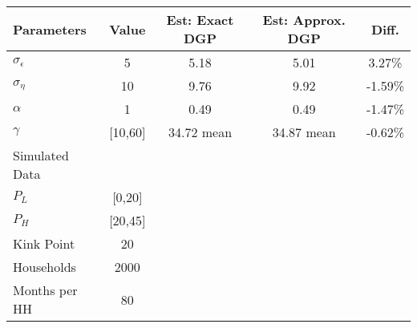 \begin{tabular}{|lcccc|}
\hline
Parameters & Value & Est: Exact DGP  &  Est: Approx. DGP & Diff.   \\
\hline
\hline
$\sigma_{\epsilon}$  &5 &5.18 &5.01 &3.27\%  \\
$\sigma_{\eta}$  &10 &9.76 &9.92 &-1.59\%    \\
$\alpha$  &1 &0.49 &0.49 &-1.47\%    \\
$\gamma$  &[10,60] &34.72 mean &34.87 mean &-0.62\%   \\
\hline
\hline
Simulated Data &    &   &    &   \\
\hline
\hline
$P_L$ &[0,20] & & & \\
$P_H$ &[20,45] & & &  \\
Kink Point &20 & & &    \\
Households &2000 & & &    \\
Months per HH &80 & & &   \\
\hline
\end{tabular}
